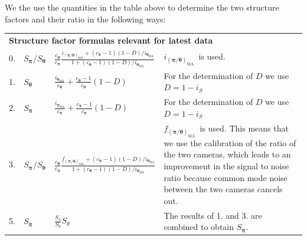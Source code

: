 \documentclass[11pt,letter]{article}
\newcommand{\bv}[1]{\ensuremath{\bm{#1}}}
\newcommand{\is}{\ensuremath{i_{S}} }
\newcommand{\ima}[1]{\ensuremath{i_{\bv{#1}_{\text{MA}}} }}
\newcommand{\fma}[1]{\ensuremath{f_{\bv{#1}_{\text{MA}}} }}
\begin{document}
\singlespacing

\vspace{1em}


We the use the quantities in the table above to determine the two structure
factors and their ratio in the following ways: 
 
\renewcommand{\arraystretch}{2.0} 
\begin{tabular}{ l | l | p{6cm} | p{8.5cm}  }
  \multicolumn{4}{l}{ \large \bf Structure factor formulas relevant for latest data  } \\  
  \noalign{\smallskip}  
  0. &
  $S_{\bv{\pi}}/S_{\bv{\theta}}$ &
   { \Large
   $\frac{ c_{\bv{\theta}} } { c_{\bv{\pi}} } 
   \frac{  \ima{(\pi/\theta)} 
               + (c_{\bv{\pi}} - 1 ) (1-D) / \ima{\theta} } 
        {   1 
               + (c_{\bv{\theta}} - 1 ) (1-D) / \ima{\theta} } $ }
         & $\ima{(\pi/\theta)}$\ is used.  \\ \hline 
  1. &
  $S_{\bv{\theta}}$  & $\frac{\ima{\theta}}{c_{\bv{\theta}}} 
      + \frac{ c_{\bv{\theta}} -1 }{c_{\bv{\theta}}}(1-D)$ 
                & For the determination of $D$ we use $D = 1 - \is$  
                  \\ \hline
  2. &
  $S_{\bv{\pi}}$  & $\frac{\ima{\pi}}{c_{\bv{\pi}}} 
      + \frac{ c_{\bv{\pi}} -1 }{c_{\bv{\pi}}}(1-D)$ 
                & For the determination of $D$ we use $D = 1 - \is$  
                  \\ \hline
  3. &
  $S_{\bv{\pi}}/S_{\bv{\theta}}$ &
  { \Large 
   $\frac{ c_{\bv{\theta}} } { c_{\bv{\pi}} } 
   \frac{  \fma{(\pi/\theta)} 
               + (c_{\bv{\pi}} - 1 ) (1-D) / \ima{\theta} } 
        {   1 
               + (c_{\bv{\theta}} - 1 ) (1-D) / \ima{\theta} } $ } 
         & $\fma{(\pi/\theta)}$\ is used.
           This means that we use the calibration of the ratio of the two 
           cameras, which leads to an improvement in the signal to noise ratio
           because common mode noise between the two cameras cancels out. 
            \\ \hline
  5. &
  $S_{\bv{\pi}}$  & $\frac{S_{\pi}}{S_{\theta}} S_{\theta}$ & 
           The results of 1. and 3. are combined to obtain $S_{\bv{\pi}}$.    
\end{tabular}
\end{document}
